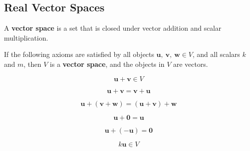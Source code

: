 \documentclass{article}
\begin{document}
\subsection{Real Vector Spaces}
\begin{definition}
    A \textbf{vector space} is a set that is closed under vector
    addition and scalar \linebreak multiplication.
\end{definition}
\begin{theorem}
    If the following axioms are satisfied by all objects
    \(\symbf{u},\: \symbf{v},\: \symbf{w} \in V\), and all scalars
    \(k\) and \(m\), then \(V\) is a \textbf{vector space}, and the
    objects in \(V\) are vectors.
\end{theorem}
\begin{axiom}
    \begin{equation*}
        \label{axiom:5_1_1}
        \symbf{u}+\symbf{v} \in V
    \end{equation*}
\end{axiom}
\begin{axiom}
    \begin{equation*}
        \label{axiom:5_1_2}
        \symbf{u} + \symbf{v} = \symbf{v} + \symbf{u}
    \end{equation*}
\end{axiom}
\begin{axiom}
    \begin{equation*}
        \label{axiom:5_1_3}
        \symbf{u} + \left(\symbf{v} + \symbf{w}\right) = \left(\symbf{u} + \symbf{v}\right) + \symbf{w}
    \end{equation*}
\end{axiom}
\begin{axiom}
    \begin{equation*}
        \label{axiom:5_1_4}
        \symbf{u} + \symbf{0} = \symbf{u}
    \end{equation*}
\end{axiom}
\begin{axiom}
    \begin{equation*}
        \label{axiom:5_1_5}
        \symbf{u} + \left(-\symbf{u}\right) = \symbf{0}
    \end{equation*}
\end{axiom}
\begin{axiom}
    \begin{equation*}
        \label{axiom:5_1_6}
        k\symbf{u} \in V
    \end{equation*}
\end{axiom}
\end{document}
